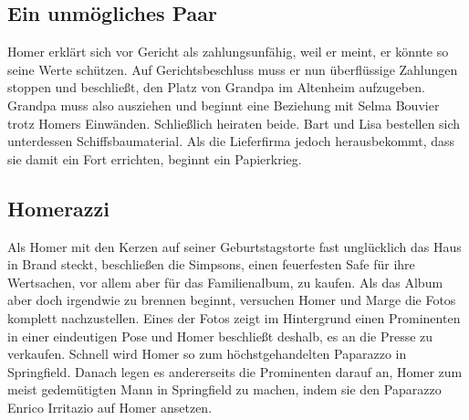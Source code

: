 
\subsection{Ein unmögliches Paar}\label{JABF08}
Homer erklärt sich vor Gericht als zahlungsunfähig, weil er meint, er könnte so seine Werte schützen. Auf Gerichtsbeschluss muss er nun überflüssige Zahlungen stoppen und beschließt, den Platz von Grandpa im Altenheim aufzugeben. Grandpa muss also ausziehen und beginnt eine Beziehung mit Selma Bouvier trotz Homers Einwänden. Schließlich heiraten beide. Bart und Lisa bestellen sich unterdessen Schiffsbaumaterial. Als die Lieferfirma jedoch herausbekommt, dass sie damit ein Fort errichten, beginnt ein Papierkrieg.



\subsection{Homerazzi}\label{JABF06}
Als Homer mit den Kerzen auf seiner Geburtstagstorte fast unglücklich das Haus in Brand steckt, beschließen die Simpsons, einen feuerfesten Safe für ihre Wertsachen, vor allem aber für das Familienalbum, zu kaufen. Als das Album aber doch irgendwie zu brennen beginnt, versuchen Homer und Marge die Fotos komplett nachzustellen. Eines der Fotos zeigt im Hintergrund einen Prominenten in einer eindeutigen Pose und Homer beschließt deshalb, es an die Presse zu verkaufen. Schnell wird Homer so zum höchstgehandelten Paparazzo in Springfield. Danach legen es andererseits die Prominenten darauf an, Homer zum meist gedemütigten Mann in Springfield zu machen, indem sie den Paparazzo Enrico Irritazio auf Homer ansetzen.

